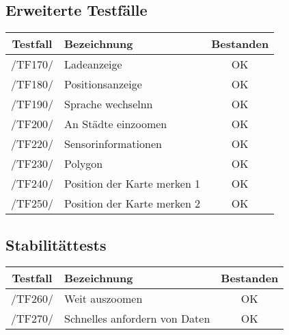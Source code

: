 \subsection{Erweiterte Testfälle}

\begin{center}
    \begin{tabular}[h]{|c|l|c|}
    \hline
        \textbf{Testfall} & \textbf{Bezeichnung} & \textbf{Bestanden} \\
        \hline
        /TF170/ & Ladeanzeige & \cellcolor{green!25}OK \\
        \hline
        /TF180/ & Positionsanzeige & \cellcolor{green!25}OK \\
        \hline
         /TF190/ & Sprache wechselnn & \cellcolor{green!25}OK \\
        \hline
         /TF200/ & An Städte einzoomen & \cellcolor{green!25}OK \\
        \hline
        /TF220/ & Sensorinformationen & \cellcolor{green!25}OK \\
        \hline
         /TF230/ & Polygon & \cellcolor{green!25}OK \\
        \hline
         /TF240/ & Position der Karte merken 1 & \cellcolor{green!25}OK \\
        \hline
          /TF250/ & Position der Karte merken 2 & \cellcolor{green!25}OK \\
        \hline

    \end{tabular}
\end{center}

\subsection{Stabilitättests}
  \begin{center}
      \begin{tabular}[h]{|c|l|c|}
       \hline
        \textbf{Testfall} & \textbf{Bezeichnung} & \textbf{Bestanden} \\
        \hline
       /TF260/ & Weit auszoomen & \cellcolor{green!25}OK \\
        \hline
          /TF270/ & Schnelles anfordern von Daten & \cellcolor{green!25}OK \\
        \hline
      \end{tabular}
  \end{center}


